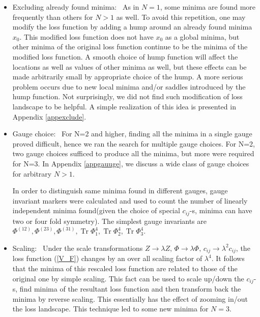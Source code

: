 \documentclass[12pt,a4paper]{JHEP3}
\newcommand{\refb}[1]{(\ref{#1})}
\newcommand{\Tr}{\mathop{\mathrm{Tr}}}
\begin{document}
\begin{itemize}
\item
Excluding already found minima: \, 
As in $N=1$, some minima are found more frequently than others for $N>1$ as well. To avoid this repetition, one may  modify the loss function by adding a hump around an already found minima $x_0$. This modified loss function does not have $x_0$ as a global minima, but other minima of  the original loss function continue to be the minima of the modified loss function. A smooth choice of hump function will affect the locations as well as values of other minima as well, but these effects can be made arbitrarily small by appropriate choice of the hump. A more serious problem occurs due to new local minima and/or saddles introduced by the hump function. Not surprisingly, we did not find such modification of loss landscape to be helpful.
A simple realization of this idea is presented in Appendix \ref{appexclude}. 

\item
Gauge choice: \,
For N=2 and higher, finding all the minima in a single gauge proved difficult, hence we ran the search for multiple gauge choices. For N=2, two gauge choices sufficed to produce all the minima, but more were required for N=3. In Appendix \ref{appgauuge}, we discuss a wide class of gauge choices for arbitrary $N>1$.

In order to distinguish same minima found in different gauges, gauge invariant markers were calculated and used to count the number of linearly independent minima found(given the choice of special $c_{ij}$-s, minima can have two or four fold symmetry). The simplest gauge invariants are $\Phi^{(12)}, \Phi^{(23)}, \Phi^{(31)}, \Tr{} \Phi^4_1, \Tr{} \Phi^4_2, \Tr{} \Phi^4_3$.

\item
Scaling: \, 
Under the scale transformations $Z \to \lambda Z, \, \Phi \to \lambda \Phi, \, c_{ij} \to \lambda^2 c_{ij}$, the loss function \refb{V_F} changes by an over all scaling factor of $\lambda^4$. It follows that the minima of this rescaled loss function are related to those of the original one by simple scaling.
This fact can be used to scale up/down the $c_{ij}$-s, find minima of the resultant loss function and then transform back the minima by reverse scaling. This essentially has the effect of zooming in/out the loss landscape. This technique led to some new minima for $N=3$.

\end{itemize}
\end{document}
